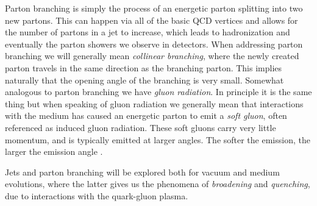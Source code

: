 \documentclass[main.tex]{subfiles}
\begin{document}
Parton branching is simply the process of an energetic parton splitting into two new partons. This can happen via all of the basic QCD vertices and allows for the number of partons in a jet to increase, which leads to hadronization and eventually the parton showers we observe in detectors. When addressing parton branching we will generally mean \emph{collinear branching}, where the newly created parton travels in the same direction as the branching parton. This implies naturally that the opening angle of the branching is very small. Somewhat analogous to parton branching we have \emph{gluon radiation}. In principle it is the same thing but when speaking of gluon radiation we generally mean that interactions with the medium has caused an energetic parton to emit a \emph{soft gluon}, often referenced as induced gluon radiation. These soft gluons carry very little momentum, and is typically emitted at larger angles. The softer the emission, the larger the emission angle \cite{medium_induced_gluon_branching}.

Jets and parton branching will be explored both for vacuum and medium evolutions, where the latter gives us the phenomena of \emph{broadening} and \emph{quenching}, due to interactions with the quark-gluon plasma.

\end{document}
